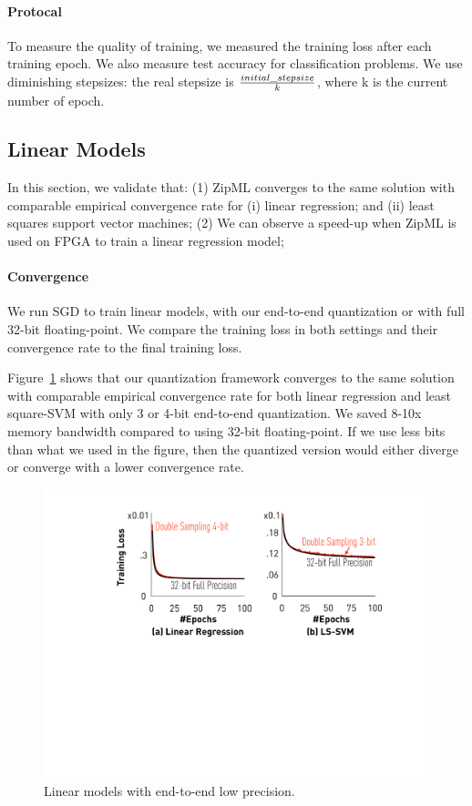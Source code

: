 \documentclass{article}
\begin{document}
\paragraph{Protocal} To measure the quality of training,
we measured the training loss after each training epoch. We also measure test accuracy for classification problems. We use diminishing stepsizes: the real stepsize is ${initial\_stepsize\over k}$, where k is the current number of epoch.

\subsection{Linear Models}
In this section, we validate that: (1) ZipML 
converges to the same solution with comparable
empirical convergence rate for (i) linear regression;
and (ii) least squares support vector machines;
(2) We can observe a speed-up when ZipML is used on FPGA to train a linear regression model;

\paragraph{Convergence}
We run SGD to train linear models, with our end-to-end quantization or with full 32-bit floating-point. We compare the training loss in both settings and their convergence rate to the final training loss.

Figure~\ref{fig:convergence} shows that our quantization framework
converges to the same solution with comparable
empirical convergence rate for both linear regression and least square-SVM
with only 3 or 4-bit end-to-end quantization. We saved 8-10x memory bandwidth compared to using 32-bit floating-point. If we use less bits than what we used in the figure, then the quantized version would either diverge or converge with a lower convergence rate.

\begin{figure}[t]
\centering
\includegraphics[width=\columnwidth]{final-experiments/linearmodel} 
\caption{Linear models with end-to-end low precision.}
\label{fig:convergence}
\end{figure}
\end{document}
